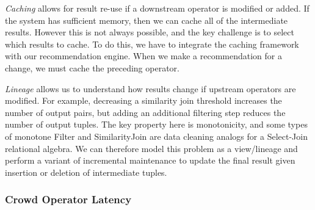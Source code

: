\textit{Caching} allows for result re-use if a downstream operator is modified or added.
If the system has sufficient memory, then we can cache all of the intermediate results. 
However this is not always possible, and the key challenge is to select which results to cache.
To do this, we have to integrate the caching framework with our recommendation engine.
When we make a recommendation for a change, we must cache the preceding operator. 

\textit{Lineage} allows us to understand how results change if upstream operators are modified.
For example, decreasing a similarity join threshold increases the number of output pairs, but adding an additional filtering step 
reduces the number of output tuples. The key property here is monotonicity, and some types of monotone \textsf{Filter} and \textsf{SimilarityJoin} are data cleaning analogs for a Select-Join relational algebra.
We can therefore model this problem as a view/lineage and perform a variant of incremental maintenance to update the 
final result given insertion or deletion of intermediate tuples.

\vspace{-0.2cm}
\subsubsection{Crowd Operator Latency}
\vspace{.2em}


